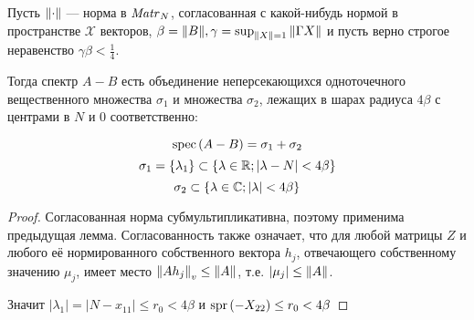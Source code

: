\begin{lemma}
    Пусть \( \norm{\cdot} \) --- норма в \( \matr{N}{} \),
    согласованная с какой-нибудь нормой в пространстве \( \mathscr{X} \) векторов,
    \( \beta = \norm{B}, \gamma=\sup_{\norm{X}=1} \norm{\Gamma X} \)
    и пусть верно строгое неравенство \( \gamma\beta < \frac14 \).

    Тогда спектр \( A - B \)
    есть объединение неперсекающихся одноточечного вещественного множества \( \sigma_1 \)
    и множества \( \sigma_2 \),
    лежащих в шарах радиуса \( 4\beta \)
    с центрами в \( N \) и \( 0 \) соответственно:

    \[ \spec{A-B} = \sigma_1 + \sigma_2 \]
    \[ \sigma_1 = \left\{\lambda_1\right\} \subset \left\{\lambda\in\RR; \lvert \lambda - N\rvert < 4\beta\right\} \]
    \[ \sigma_2 \subset \left\{\lambda\in\CC; \lvert\lambda\rvert <4\beta \right\} \]
\end{lemma}
\begin{proof}
    Согласованная норма субмультипликативна, поэтому применима предыдущая лемма.
    Согласованность также означает, что для любой матрицы \( Z \)
    и любого её нормированного собственного вектора \( h_j \),
    отвечающего собственному значению \( \mu_j \),
    имеет место \({ \normex{v}{A h_j} \leq \norm{A} }\),
    т.е. \({ \lvert \mu_j \rvert \leq \norm{A} }\).

    Значит \( \lvert\lambda_1\rvert = \lvert N - x_{11} \rvert \leq r_0 < 4\beta \)
    и \( \spr{-X_{22}} \leq r_0 < 4\beta  \)
\end{proof}


